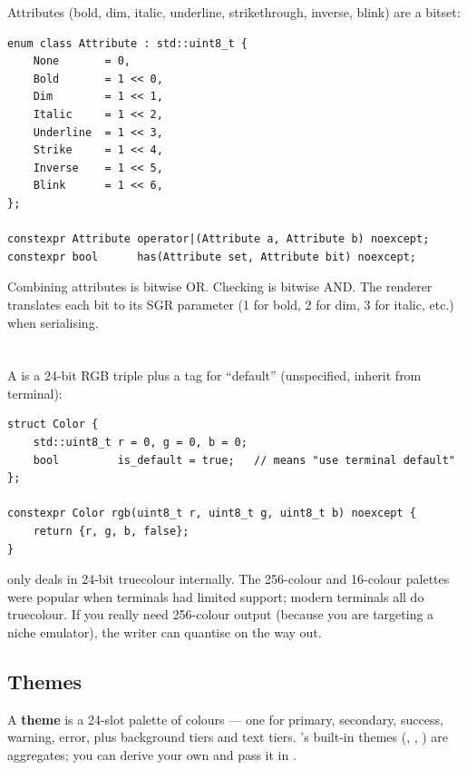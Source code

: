 Attributes (bold, dim, italic, underline, strikethrough, inverse,
blink) are a bitset:

\begin{lstlisting}
enum class Attribute : std::uint8_t {
    None       = 0,
    Bold       = 1 << 0,
    Dim        = 1 << 1,
    Italic     = 1 << 2,
    Underline  = 1 << 3,
    Strike     = 1 << 4,
    Inverse    = 1 << 5,
    Blink      = 1 << 6,
};

constexpr Attribute operator|(Attribute a, Attribute b) noexcept;
constexpr bool      has(Attribute set, Attribute bit) noexcept;
\end{lstlisting}

Combining attributes is bitwise OR. Checking is bitwise AND. The
renderer translates each bit to its SGR parameter (1 for bold, 2 for
dim, 3 for italic, etc.) when serialising.

\section{}

A  is a 24-bit RGB triple plus a tag for ``default''
(unspecified, inherit from terminal):

\begin{lstlisting}
struct Color {
    std::uint8_t r = 0, g = 0, b = 0;
    bool         is_default = true;   // means "use terminal default"
};

constexpr Color rgb(uint8_t r, uint8_t g, uint8_t b) noexcept {
    return {r, g, b, false};
}
\end{lstlisting}

\maya{} only deals in 24-bit truecolour internally. The 256-colour and
16-colour palettes were popular when terminals had limited support;
modern terminals all do truecolour. If you really need 256-colour
output (because you are targeting a niche emulator), the writer can
quantise on the way out.

\subsection{Themes}

A \textbf{theme} is a 24-slot palette of colours --- one for primary,
secondary, success, warning, error, plus background tiers and text
tiers. \maya{}'s built-in themes (, ,
) are  aggregates; you can derive your
own and pass it in .

